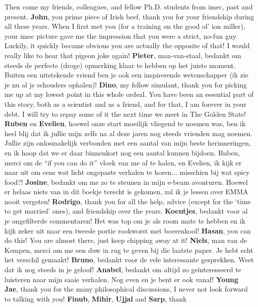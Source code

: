 Then come my friends, colleagues, and fellow Ph.D. students from imec, past and present. \textbf{John}, you
prime piece of Irish beef, thank you for your friendship during all these years. When I first met you (for a
training on the good ol' ion miller), your imec picture gave me the impression that you were a strict, no-fun
guy. Luckily, it quickly became obvious you are actually the opposite of that! I would really like to hear
that pigeon joke again! \textbf{Pieter}, man-van-staal, bedankt om steeds de perfecte (droge) opmerking klaar
te hebben op het juiste moment. Buiten een uitstekende vriend ben je ook een inspirerende wetenschapper (ik
zie je nu al je schouders ophalen)! \textbf{Dino}, my fellow simulant, thank you for picking me up at my
lowest point in this whole ordeal. You have been an essential part of this story, both as a scientist and as a
friend, and for that, I am forever in your debt. I will try to repay some of it the next time we meet in The
Golden State! \textbf{Ruben} en \textbf{Evelien}, hoewel onze start moeilijk vliegend te noemen was, ben ik
heel blij dat ik jullie mijn zelfs na al deze jaren nog steeds vrienden mag noemen. Jullie zijn onlosmakelijk
verbonden met een aantal van mijn beste herinneringen, en ik hoop dat we er daar binnenkort nog een aantal
kunnen bijdoen. Ruben, merci om de ``if you can do it'' vloek van me af te halen, en Evelien, ik kijk er naar
uit om eens wat licht ongepaste verhalen te horen... misschien bij wat spicy food?! \textbf{Josine}, bedankt
om me zo te steunen in mijn e-beam avonturen. Hoewel er helaas niets van in dit boekje terecht is gekomen, zal
ik je lessen over EMMA nooit vergeten! \textbf{Rodrigo}, thank you for all the help, advice (except for the
`time to get married' ones), and friendship over the years. \textbf{Koentjes}, bedankt voor al je ongefilterde
commentaren! Het was top om je als room mate te hebben en ik kijk zeker uit naar een tweede portie rookworst
met boerenkool! \textbf{Hasan}, you can do this! You are almost there, just keep chipping away at it!
\textbf{Niels}, man van de Kempen, merci om me een duw in rug te geven bij die laatste paper. Je hebt echt het
verschil gemaakt! \textbf{Bruno}, bedankt voor de vele interessante gesprekken. Weet dat ik nog steeds in je
geloof! \textbf{Anabel}, bedankt om altijd zo ge\"{i}nteresseerd te luisteren naar mijn saaie verhalen. Nog
even en je bent er ook vanaf! \textbf{Young Jae}, thank you for the many philosophical discussions, I never
not look forward to talking with you! \textbf{Finub}, \textbf{Mihir}, \textbf{Ujjal} and \textbf{Sarp}, thank
